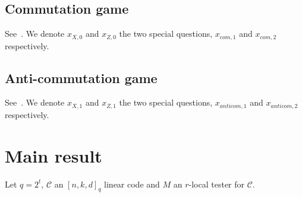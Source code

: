 \documentclass[11pt]{article}
\theoremstyle{definition}
\newcommand{\code}{\mathcal{C}}
\begin{document}
\subsection{Commutation game}

See~\cite[Section 3.1]{de2022spectral}. We denote $x_{X,0}$ and $x_{Z,0}$ the two special questions, $x_{com,1}$ and $x_{com,2}$ respectively. 

\subsection{Anti-commutation game}

See~\cite[Section 3.2]{de2022spectral}. We denote $x_{X,1}$ and $x_{Z,1}$ the two special questions, $x_{anticom,1}$ and $x_{anticom,2}$ respectively. 

\section{Main result}

Let $q=2^t$, $\code$ an $[n,k,d]_q$ linear code and $M$ an $r$-local tester for $\code$. 
\end{document}
